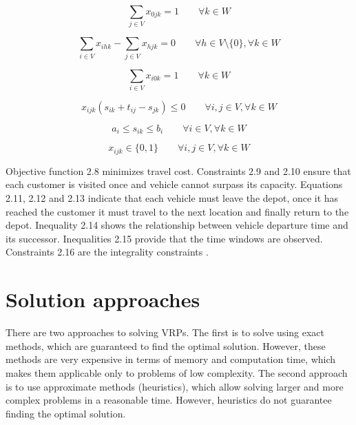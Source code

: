 \documentclass[a4paper,twoside,12pt]{book}
\begin{document}
\begin{equation}
\sum_{j \in V}x_{0jk} = 1 \qquad \forall k \in W
\end{equation}

\begin{equation}
\sum_{i \in V}x_{ihk} -\sum_{j \in V}x_{hjk} = 0 \qquad \forall h \in V \setminus \lbrace 0 \rbrace, \forall k \in W
\end{equation}

\begin{equation}
\sum_{i \in V}x_{i0k} = 1 \qquad \forall k \in W
\end{equation}

\begin{equation}
x_{ijk}(s_{ik}+t_{ij}-s_{jk}) \leq 0 \qquad \forall i,j \in V ,\forall k \in W
\end{equation}

\begin{equation}
a_{i}\leq s_{ik} \leq b_{i} \qquad \forall i \in V ,\forall k \in W
\end{equation}

\begin{equation}
x_{ijk} \in \lbrace 0,1 \rbrace \qquad \forall i,j \in V ,\forall k \in W
\end{equation}

Objective function 2.8 minimizes travel cost. Constraints 2.9 and 2.10 ensure that each customer is visited once and vehicle cannot surpass its capacity. Equations 2.11, 2.12 and 2.13 indicate that each vehicle must leave the depot, once it has reached the customer it must travel to the next location and finally return to the depot. Inequality 2.14 shows the relationship between vehicle departure time and its successor. Inequalities 2.15 provide that the time windows are observed. Constraints 2.16 are the integrality constraints \cite{bib:chapter:VRPTW}.

\section{Solution approaches}

There are two approaches to solving VRPs. The first is to solve using exact methods, which are guaranteed to find the optimal solution. However, these methods are very expensive in terms of memory and computation time, which makes them applicable only to problems of low complexity. The second approach is to use approximate methods (heuristics), which allow solving larger and more complex problems in a reasonable time. However, heuristics do not guarantee finding the optimal solution. 
\end{document}
